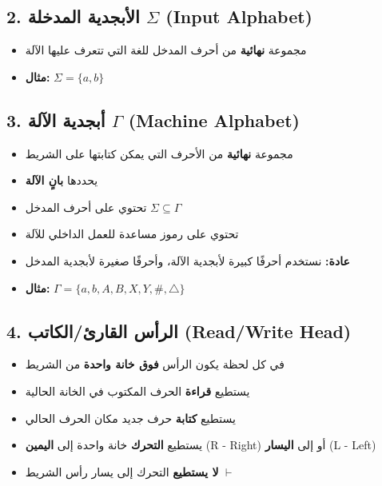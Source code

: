 \documentclass[14pt]{extarticle}
\begin{document}
\subsection{2. الأبجدية المدخلة $\Sigma$ (\textenglish{Input Alphabet})}

\begin{itemize}
    \item مجموعة \textbf{نهائية} من أحرف المدخل للغة التي تتعرف عليها الآلة
    \item \textbf{مثال:} $\Sigma = \{a, b\}$
\end{itemize}

\subsection{3. أبجدية الآلة $\Gamma$ (\textenglish{Machine Alphabet})}

\begin{itemize}
    \item مجموعة \textbf{نهائية} من الأحرف التي يمكن كتابتها على الشريط
    \item يحددها \textbf{بانٍ الآلة}
    \item تحتوي على أحرف المدخل $\Sigma \subseteq \Gamma$
    \item تحتوي على رموز مساعدة للعمل الداخلي للآلة
    \item \textbf{عادة:} نستخدم أحرفًا كبيرة لأبجدية الآلة، وأحرفًا صغيرة لأبجدية المدخل
    \item \textbf{مثال:} $\Gamma = \{a, b, A, B, X, Y, \#, \triangle\}$
\end{itemize}

\subsection{4. الرأس القارئ/الكاتب (\textenglish{Read/Write Head})}

\begin{itemize}
    \item في كل لحظة يكون الرأس \textbf{فوق خانة واحدة} من الشريط
    \item يستطيع \textbf{قراءة} الحرف المكتوب في الخانة الحالية
    \item يستطيع \textbf{كتابة} حرف جديد مكان الحرف الحالي
    \item يستطيع \textbf{التحرك} خانة واحدة إلى \textbf{اليمين} (\textenglish{R - Right}) أو إلى \textbf{اليسار} (\textenglish{L - Left})
    \item \textbf{لا يستطيع} التحرك إلى يسار رأس الشريط $\vdash$
\end{itemize}
\end{document}
